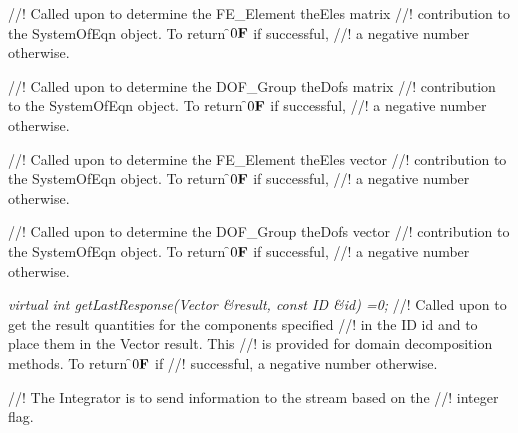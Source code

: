 //! Called upon to determine the FE\_Element \p theEles matrix
//! contribution to the SystemOfEqn object. To return \f$0{\bf F}$ if successful,
//! a negative number otherwise. 
 

//! Called upon to determine the DOF\_Group \p theDofs matrix
//! contribution to the SystemOfEqn object. To return \f$0{\bf F}$ if successful,
//! a negative number otherwise. 


//! Called upon to determine the FE\_Element \p theEles vector
//! contribution to the SystemOfEqn object. To return \f$0{\bf F}$ if successful,
//! a negative number otherwise. 


//! Called upon to determine the DOF\_Group \p theDofs vector
//! contribution to the SystemOfEqn object. To return \f$0{\bf F}$ if successful,
//! a negative number otherwise. 

{\em virtual int getLastResponse(Vector \&result, const ID \&id) =0;}
//! Called upon to get the result quantities for the components specified
//! in the ID \p id and to place them in the Vector \p result. This
//! is provided for domain decomposition methods. To return \f$0{\bf F}$ if
//! successful, a negative number otherwise. 

//! The Integrator is to send information to the stream based on the
//! integer \p flag. 

